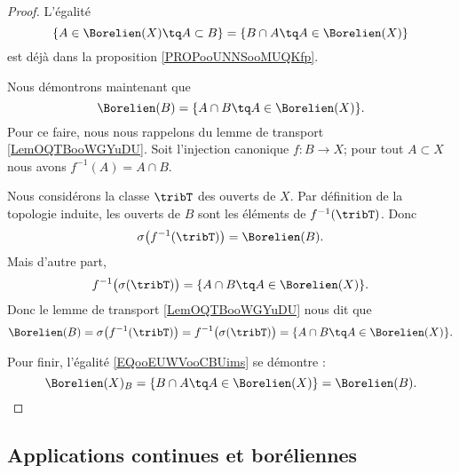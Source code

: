 \begin{proof}
	L'égalité
	\begin{equation}
		\{ A\in \Borelien(X)\tq A\subset B \}=\{ B\cap A\tq A\in \Borelien(X) \}
	\end{equation}
	est déjà dans la proposition \ref{PROPooUNNSooMUQKfp}.

	Nous démontrons maintenant que
	\begin{equation}
		\Borelien(B)=\{ A\cap B\tq A\in\Borelien(X) \}.
	\end{equation}
	Pour ce faire, nous nous rappelons du lemme de transport \ref{LemOQTBooWGYuDU}. Soit l'injection canonique \( f\colon B\to X\); pour tout \( A\subset X\) nous avons \( f^{-1}(A)=A\cap B\).

	Nous considérons la classe \( \tribT\) des ouverts de \( X\). Par définition de la topologie induite, les ouverts de \( B\) sont les éléments de \( f^{-1}(\tribT)\). Donc
	\begin{equation}
		\sigma\big( f^{-1}(\tribT) \big)=\Borelien(B).
	\end{equation}
	Mais d'autre part,
	\begin{equation}
		f^{-1}\big( \sigma(\tribT) \big)=\{ A\cap B\tq A\in \Borelien(X) \}.
	\end{equation}
	Donc le lemme de transport \ref{LemOQTBooWGYuDU} nous dit que
	\begin{equation}
		\Borelien(B)=\sigma\big( f^{-1}(\tribT) \big)= f^{-1}\big( \sigma(\tribT) \big)=\{ A\cap B\tq A\in \Borelien(X) \}.
	\end{equation}

	Pour finir, l'égalité \eqref{EQooEUWVooCBUims} se démontre :
	\begin{equation}
		\Borelien(X)_B=\{ B\cap A\tq A\in \Borelien(X) \}=\Borelien(B).
	\end{equation}
\end{proof}

\subsection{Applications continues et boréliennes}

